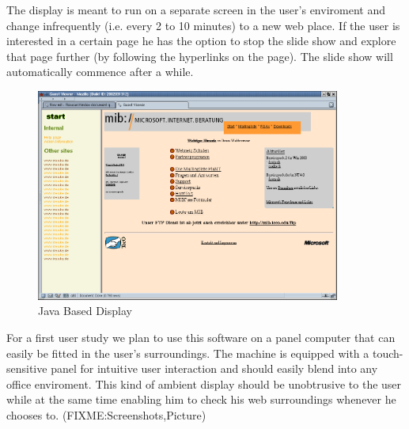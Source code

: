 \documentclass[a4paper]{danarticle}
\theoremstyle{remark}
\begin{document}
      The display is meant to run on a separate screen in the user's enviroment
      and change infrequently (i.e. every 2 to 10 minutes) to a new web place.
      If the user is interested in a certain page he has the option to stop the
      slide show and explore that page further (by following the hyperlinks on
      the page). The slide show will automatically commence after a while.
      \begin{figure}[ht]
       \centering
	 \includegraphics[width=10cm]{javaclient}
	 \caption{Java Based Display}
	 \label{javaclient}
       \end{figure}
      
      For a first user study we plan to use this software on a panel computer 
      that can easily be fitted in the user's surroundings. The machine is 
      equipped with a touch-sensitive panel for intuitive user interaction and 
      should easily blend into any office enviroment. This kind of ambient 
      display should be unobtrusive to the user while at the same time enabling 
      him to check his web surroundings whenever he chooses to.
      (FIXME:Screenshots,Picture)
\end{document}
